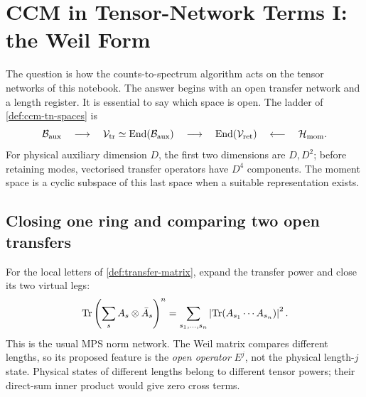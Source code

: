 
\section{CCM in Tensor-Network Terms I: the Weil Form}
\label{sec:ccm-tn-gram}

The question is how the counts-to-spectrum algorithm acts on the
tensor networks of this notebook. The answer begins with an open
transfer network and a length register. It is essential to say which
space is open. The ladder of \cref{def:ccm-tn-spaces} is
\[
 \mathcal B_{\mathrm{aux}}\quad\longrightarrow\quad
 \mathcal V_{\mathrm{tr}}\simeq\operatorname{End}(\mathcal B_{\mathrm{aux}})\quad\longrightarrow\quad
 \operatorname{End}(\mathcal V_{\mathrm{ret}})\quad\longleftarrow\quad\mathcal H_{\mathrm{mom}}.
\]
For physical auxiliary dimension $D$, the first two dimensions are
$D,D^2$; before retaining modes, vectorised transfer operators have
$D^4$ components. The moment space is a cyclic subspace of this last
space when a suitable representation exists.

\subsection{Closing one ring and comparing two open transfers}

For the local letters of \cref{def:transfer-matrix}, expand the transfer
power and close its two virtual legs:
\[
 \operatorname{Tr}\left(\sum_s A_s\otimes\bar A_s\right)^n
 =\sum_{s_1,\ldots,s_n}\left|\operatorname{Tr}(A_{s_1}\cdots A_{s_n})\right|^2.
\]
This is the usual MPS norm network. The Weil matrix compares different
lengths, so its proposed feature is the \emph{open operator} $E^j$,
not the physical length-$j$ state. Physical states of different lengths
belong to different tensor powers; their direct-sum inner product would
give zero cross terms.


